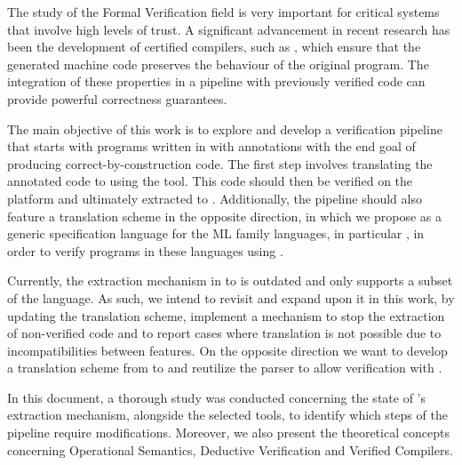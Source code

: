 
%

The study of the Formal Verification field is very important for critical systems that
involve high levels of trust. A significant advancement in recent research has been the
development of certified compilers, such as \cml, which ensure that the generated 
machine code preserves the behaviour of the original program. The integration of these 
properties in a pipeline with previously verified code can provide powerful correctness
guarantees. 

The main objective of this work is to explore and develop a verification pipeline 
that starts with programs written in \ocaml with \gospel annotations with the end goal of
producing correct-by-construction \cml code. The first step involves translating the
annotated \ocaml code to \whyml using the \cameleer tool. This \whyml code should then be 
verified on the \whythree platform and ultimately extracted to \cml. Additionally, the 
pipeline should also feature a translation scheme in the opposite direction, in which
we propose \gospel as a generic specification language for the ML family languages, in
particular \cml, in order to verify programs in these languages using \cameleer.

Currently, the extraction mechanism in \whythree to \cml is outdated and only supports
a subset of the language. As such, we intend to revisit and expand upon it in this 
work, by updating the translation scheme, implement a mechanism to stop the extraction
of non-verified code and to report cases where translation is not possible due to 
incompatibilities between features. On the opposite direction we want to develop
a translation scheme from \cml to \ocaml and reutilize the \gospel parser to allow 
verification with \cameleer.

In this document, a thorough study was conducted concerning the state of \whythree's
extraction mechanism, alongside the selected tools, to identify which steps of the 
pipeline require modifications. Moreover, we also present the theoretical 
concepts concerning Operational Semantics, Deductive Verification and Verified 
Compilers.



